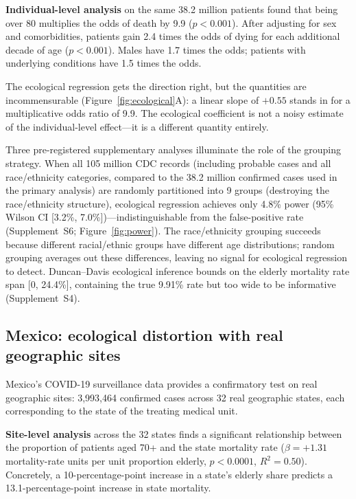 \documentclass[11pt]{article}
\begin{document}
\textbf{Individual-level analysis} on the same 38.2 million patients found
that being over 80 multiplies the odds of death by 9.9 ($p < 0.001$).
After adjusting for sex and comorbidities, patients gain 2.4 times the odds of
dying for each additional decade of age ($p < 0.001$).  Males have 1.7
times the odds; patients with underlying conditions have 1.5 times the odds.

The ecological regression gets the direction right, but the quantities are
incommensurable (Figure~\ref{fig:ecological}A): a linear slope of $+0.55$
stands in for a multiplicative odds ratio of 9.9.  The ecological
coefficient is not a noisy estimate of the individual-level effect---it is a
different quantity entirely.

Three pre-registered supplementary analyses illuminate the role of the
grouping strategy.  When all 105 million CDC records (including probable
cases and all race/ethnicity categories, compared to the 38.2 million
confirmed cases used in the primary analysis) are randomly
partitioned into 9 groups (destroying the race/ethnicity structure),
ecological regression achieves only 4.8\% power (95\% Wilson CI
[3.2\%, 7.0\%])---indistinguishable from the false-positive rate
(Supplement~S6; Figure~\ref{fig:power}).  The race/ethnicity grouping
succeeds because different racial/ethnic groups have different age
distributions; random grouping averages out these differences, leaving no
signal for ecological regression to detect.  Duncan--Davis ecological
inference bounds on the elderly mortality rate span [0, 24.4\%], containing
the true 9.91\% rate but too wide to be informative (Supplement~S4).


\subsection{Mexico: ecological distortion with real geographic sites}

Mexico's COVID-19 surveillance data provides a confirmatory test on real
geographic sites: 3,993,464 confirmed cases across
32 real geographic states, each corresponding to the state of the treating
medical unit.

\textbf{Site-level analysis} across the 32 states finds a significant
relationship between the proportion of patients aged 70+ and the state
mortality rate ($\beta = +1.31$ mortality-rate units per unit proportion
elderly, $p < 0.0001$, $R^2 = 0.50$).  Concretely, a 10-percentage-point
increase in a state's elderly share predicts a 13.1-percentage-point
increase in state mortality.
\end{document}
